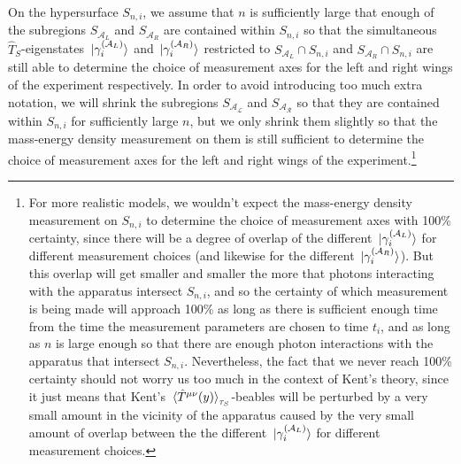 On the hypersurface $S_{n,i}$, we assume that $n$ is sufficiently large that enough of the subregions $S_{\mathcal{A}_L}$ and $S_{\mathcal{A}_R}$ are contained within $S_{n,i}$ so that the simultaneous $\hat{T}_S$-eigenstates $\ket*{\gamma_i^{(\mathcal{A}_L)}}$ and $\ket*{\gamma_i^{(\mathcal{A}_R)}}$ restricted to $S_{\mathcal{A}_L}\cap S_{n,i}$ and $S_{\mathcal{A}_R}\cap S_{n,i}$ are still able to determine the choice of measurement axes for the left and right wings of the experiment respectively. In order to avoid introducing too much extra notation, we will shrink the subregions $S_{\mathcal{A_L}}$ and $S_{\mathcal{A_R}}$ so that they are contained within $S_{n,i}$ for sufficiently large $n$, but we only shrink them slightly so that the mass-energy density measurement on them is still sufficient to determine the choice of measurement axes for the left and right wings of the experiment.\footnote{For more realistic models, we wouldn't expect the mass-energy density measurement on $S_{n,i}$ to determine the choice of measurement axes with 100\% certainty, since there will be a degree of overlap of the different $\ket*{\gamma_i^{(\mathcal{A}_L)}}$ for different measurement choices (and likewise for the different $\ket*{\gamma_i^{(\mathcal{A}_R)}}$). But this overlap will get smaller and smaller the more that photons interacting with the apparatus intersect $S_{n,i}$, and so the certainty of which measurement is being made will approach 100\% as long as there is sufficient enough time from the time the measurement parameters are chosen to time $t_i$, and as long as $n$ is large enough so that there are enough photon interactions with the apparatus that intersect $S_{n,i}$. Nevertheless, the fact that we never reach 100\% certainty should not worry us too much in the context of Kent's theory, since it just means that Kent's $\ev*{\hat{T}^{\mu\nu}(y)}_{\tau_S}$-beables will be perturbed by a very small amount in the vicinity of the apparatus caused by the very small amount of overlap between the the different $\ket*{\gamma_i^{(\mathcal{A}_L)}}$ for different measurement choices. }   

